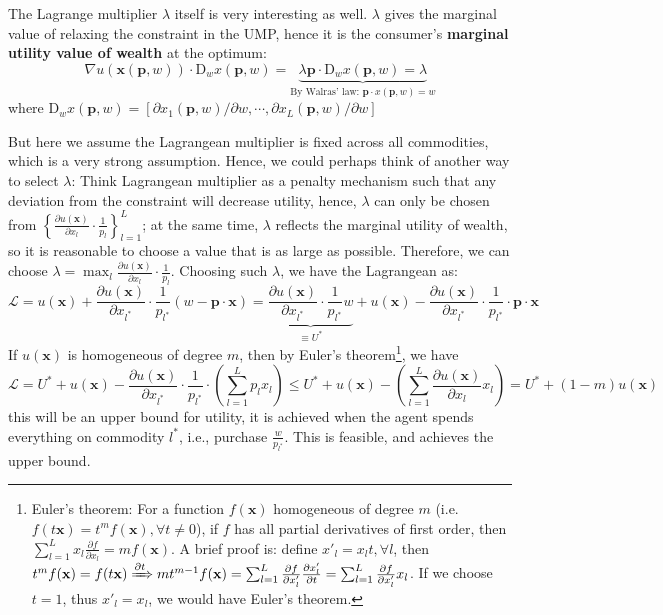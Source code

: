 The Lagrange multiplier $\lambda$ itself is very interesting as well. $\lambda$ gives the marginal value of relaxing the constraint in the UMP, hence it is the consumer's \textbf{marginal utility value of wealth} at the optimum: $$\nabla u(\textbf{x}(\textbf{p},w))\cdot \mathrm{D}_w x(\mathbf{p},w)=\underbrace{\lambda \mathbf{p}\cdot \mathrm{D}_w x(\mathbf{p},w)=\lambda}_{\text{By Walras' law: }\mathbf{p}\cdot x(\mathbf{p},w)=w}$$ where $\mathrm{D}_w x(\mathbf{p},w)=\left[\partial x_1(\mathbf{p},w)/\partial w,\cdots, \partial x_L(\mathbf{p},w)/\partial w\right]$

But here we assume the Lagrangean multiplier is fixed across all commodities, which is a very strong assumption. Hence, we could perhaps think of another way to select $\lambda$: 
Think Lagrangean multiplier as a penalty mechanism such that any deviation from the constraint will decrease utility, hence, $\lambda$ can only be chosen from $\left\{\frac{\partial u(\mathbf{x})}{\partial x_l}\cdot\frac{1}{p_l} \right\}^L_{l=1}$; at the same time, $\lambda$ reflects the marginal utility of wealth, 
so it is reasonable to choose a value that is as large as possible. Therefore, we can choose $\lambda = \max_l \frac{\partial u(\mathbf{x})}{\partial x_l}\cdot \frac{1}{p_l}$. Choosing such $\lambda$, we have the Lagrangean as: $$ \mathcal{L} = u(\mathbf{x}) + \frac{\partial u(\mathbf{x})}{\partial x_{l^*}}\cdot\frac{1}{p_{l^*}}\left(w-\mathbf{p}\cdot\mathbf{x} \right) = \underbrace{\frac{\partial u(\mathbf{x})}{\partial x_{l^*}}\cdot\frac{1}{p_{l^*}}w}_{\equiv U^*} + u(\mathbf{x}) - \frac{\partial u(\mathbf{x})}{\partial x_{l^*}}\cdot\frac{1}{p_{l^*}}\cdot \mathbf{p}\cdot\mathbf{x}$$
If $u(\mathbf{x})$ is homogeneous of degree $m$, then by Euler's theorem\footnote{Euler's theorem: For a function $f(\mathbf{x})$ homogeneous of degree $m$ (i.e. $f(t\mathbf{x})=t^mf(\mathbf{x}),\forall t\neq 0$), if $f$ has all partial derivatives of first order, then $\sum^L_{l=1}x_l\frac{\partial f}{\partial x_l}=mf(\mathbf{x})$. A brief proof is: define $x'_l=x_l t,\forall l$, then $t^mf(\mathbf{x})=f(t\mathbf{x})\xRightarrow{\partial t} mt^{m-1}f(\mathbf{x})=\sum^L_{l=1}\frac{\partial f}{\partial x'_l}\frac{\partial x'_l}{\partial t}=\sum^L_{l=1}\frac{\partial f}{\partial x'_l}x_l$.
If we choose $t=1$, thus $x'_l=x_l$, we would have Euler's theorem.}, we have 
    $$\mathcal{L} = U^* +u(\mathbf{x})- \frac{\partial u(\mathbf{x})}{\partial x_{l^*}}\cdot\frac{1}{p_{l^*}}\cdot \left(\sum_{l=1}^L p_lx_l \right) \leq U^* + u(\mathbf{x})- \left(\sum_{l=1}^L \frac{\partial u(\mathbf{x})}{\partial x_{l}} x_l\right) = U^* +(1-m)u(\mathbf{x})$$
this will be an upper bound for utility, it is achieved when the agent spends everything on commodity $l^*$, i.e., purchase $\frac{w}{p_{l^*}}$. This is feasible, and achieves the upper bound.

